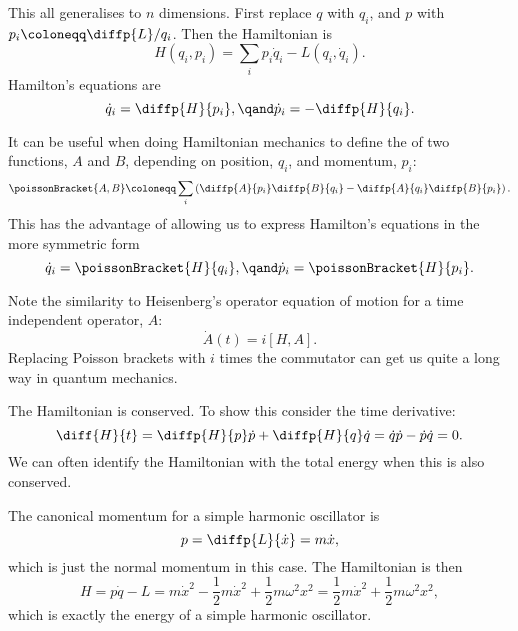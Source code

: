 \documentclass[fleqn]{NotesClass}
\newcommand{\lagrangian}{L}
\begin{document}
    This all generalises to \(n\) dimensions.
    First replace \(q\) with \(q_i\), and \(p\) with \(p_i \coloneqq \diffp{\lagrangian}/{q_i}\).
    Then the Hamiltonian is
    \begin{equation}
        H(q_i, p_i) = \sum_i p_i \dot{q}_i - \lagrangian(q_i, \dot{q}_i).
    \end{equation}
    Hamilton's equations are
    \begin{equation}
        \dot{q}_i = \diffp{H}{p_i}, \qand \dot{p}_i = -\diffp{H}{q_i}.
    \end{equation}
    
    It can be useful when doing Hamiltonian mechanics to define the  of two functions, \(A\) and \(B\), depending on position, \(q_i\), and momentum, \(p_i\):
    \begin{equation}
        \poissonBracket{A, B} \coloneqq \sum_i \left( \diffp{A}{p_i}\diffp{B}{q_i} - \diffp{A}{q_i}\diffp{B}{p_i} \right).
    \end{equation}
    This has the advantage of allowing us to express Hamilton's equations in the more symmetric form
    \begin{equation}\label{eqn:hamilton's equations with poisson brackets}
        \dot{q}_i = \poissonBracket{H}{q_i}, \qand \dot{p}_i = \poissonBracket{H}{p_i}.
    \end{equation}
    
    Note the similarity to Heisenberg's operator equation of motion for a time independent operator, \(A\):
    \begin{equation}
        \dot{A}(t) = i [H, A].
    \end{equation}
    Replacing Poisson brackets with \(i\) times the commutator can get us quite a long way in quantum mechanics.
    
    The Hamiltonian is conserved.
    To show this consider the time derivative:
    \begin{equation}
        \diff{H}{t} = \diffp{H}{p} \dot{p} + \diffp{H}{q} \dot{q} = \dot{q}\dot{p} - \dot{p}\dot{q} = 0.
    \end{equation}
    We can often identify the Hamiltonian with the total energy when this is also conserved.
    
    \begin{exm}{}{}
        The canonical momentum for a simple harmonic oscillator is
        \begin{equation}
            p = \diffp{\lagrangian}{\dot{x}} = m\dot{x},
        \end{equation}
        which is just the normal momentum in this case.
        The Hamiltonian is then
        \begin{equation}
            H = p\dot{q} - \lagrangian = m\dot{x}^2 - \frac{1}{2}m\dot{x}^2 + \frac{1}{2}m\omega^2x^2 = \frac{1}{2}m\dot{x}^2 + \frac{1}{2}m\omega^2x^2,
        \end{equation}
        which is exactly the energy of a simple harmonic oscillator.
    \end{exm}
    
\end{document}
